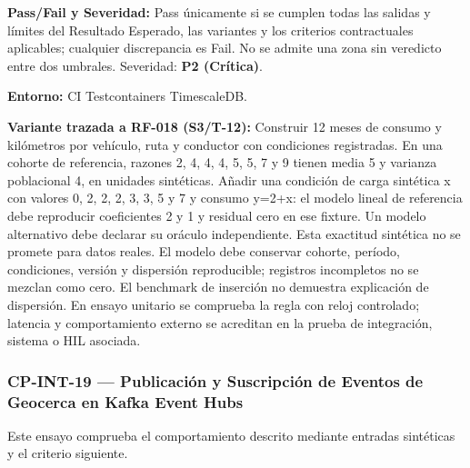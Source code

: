 \par\noindent\textbf{Pass/Fail y Severidad:} Pass únicamente si se cumplen todas las salidas y límites del Resultado Esperado, las variantes y los criterios contractuales aplicables; cualquier discrepancia es Fail. No se admite una zona sin veredicto entre dos umbrales. Severidad: \textbf{P2 (Crítica)}.\par
\par\noindent\textbf{Entorno:} CI Testcontainers TimescaleDB.\par







\par\noindent\textbf{Variante trazada a RF-018 (S3/T-12):} Construir 12 meses de consumo y kilómetros por vehículo, ruta y conductor con condiciones registradas. En una cohorte de referencia, razones 2, 4, 4, 4, 5, 5, 7 y 9 tienen media 5 y varianza poblacional 4, en unidades sintéticas. Añadir una condición de carga sintética x con valores 0, 2, 2, 2, 3, 3, 5 y 7 y consumo y=2+x: el modelo lineal de referencia debe reproducir coeficientes 2 y 1 y residual cero en ese fixture. Un modelo alternativo debe declarar su oráculo independiente. Esta exactitud sintética no se promete para datos reales. El modelo debe conservar cohorte, período, condiciones, versión y dispersión reproducible; registros incompletos no se mezclan como cero. El benchmark de inserción no demuestra explicación de dispersión. En ensayo unitario se comprueba la regla con reloj controlado; latencia y comportamiento externo se acreditan en la prueba de integración, sistema o HIL asociada.\par
\subsubsection*{CP-INT-19 — Publicación y Suscripción de Eventos de Geocerca en Kafka Event Hubs}\label{sec:9-cp-int-19}
Este ensayo comprueba el comportamiento descrito mediante entradas sintéticas y el criterio siguiente.

